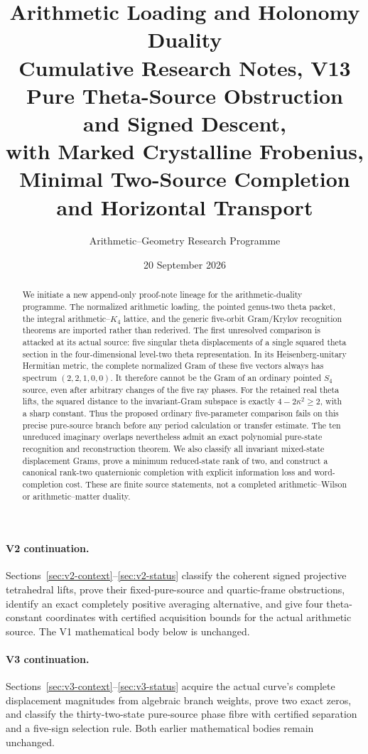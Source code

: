 \documentclass[11pt]{article}
\title{\textbf{Arithmetic Loading and Holonomy Duality}\\[0.35em]
\large Cumulative Research Notes, V13\\[0.3em]
\normalsize Pure Theta-Source Obstruction and Signed Descent,\\
with Marked Crystalline Frobenius,\\
Minimal Two-Source Completion and Horizontal Transport}
\author{Arithmetic--Geometry Research Programme}
\date{20 September 2026}
\theoremstyle{definition}
\theoremstyle{remark}
\begin{document}
\maketitle
\begin{abstract}
We initiate a new append-only proof-note lineage for the arithmetic-duality programme. The normalized arithmetic loading, the pointed genus-two theta packet, the integral arithmetic--$K_4$ lattice, and the generic five-orbit Gram/Krylov recognition theorems are imported rather than rederived. The first unresolved comparison is attacked at its actual source: five singular theta displacements of a single squared theta section in the four-dimensional level-two theta representation. In its Heisenberg-unitary Hermitian metric, the complete normalized Gram of these five vectors always has spectrum $(2,2,1,0,0)$. It therefore cannot be the Gram of an ordinary pointed $S_4$ source, even after arbitrary changes of the five ray phases. For the retained real theta lifts, the squared distance to the invariant-Gram subspace is exactly $4-2\kappa^2\ge2$, with a sharp constant. Thus the proposed ordinary five-parameter comparison fails on this precise pure-source branch before any period calculation or transfer estimate. The ten unreduced imaginary overlaps nevertheless admit an exact polynomial pure-state recognition and reconstruction theorem. We also classify all invariant mixed-state displacement Grams, prove a minimum reduced-state rank of two, and construct a canonical rank-two quaternionic completion with explicit information loss and word-completion cost. These are finite source statements, not a completed arithmetic--Wilson or arithmetic--matter duality.
\end{abstract}
\paragraph{V2 continuation.}
Sections~\ref{sec:v2-context}--\ref{sec:v2-status} classify the coherent signed
projective tetrahedral lifts, prove their fixed-pure-source and quartic-frame
obstructions, identify an exact completely positive averaging alternative,
and give four theta-constant coordinates with certified acquisition bounds
for the actual arithmetic source. The V1 mathematical body below is unchanged.
\paragraph{V3 continuation.}
Sections~\ref{sec:v3-context}--\ref{sec:v3-status} acquire the actual
curve's complete displacement magnitudes from algebraic branch weights,
prove two exact zeros, and classify the thirty-two-state pure-source phase
fibre with certified separation and a five-sign selection rule. Both earlier
mathematical bodies remain unchanged.
\end{document}
